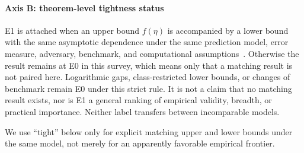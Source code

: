 \documentclass[acmsmall,screen,nonacm]{acmart}
\theoremstyle{acmdefinition}%
\begin{document}
\paragraph{Axis B: theorem-level tightness status} E1 is attached when an upper bound $f(\eta)$ is accompanied by a lower bound with the same asymptotic dependence under the same prediction model, error measure, adversary, benchmark, and computational assumptions~\cite{wei2020optimal,antoniadis2023metric,dinitz2024binarysearch,balkanski2024randomized}. Otherwise the result remains at E0 in this survey, which means only that a matching result is not paired here. Logarithmic gaps, class-restricted lower bounds, or changes of benchmark remain E0 under this strict rule. It is not a claim that no matching result exists, nor is E1 a general ranking of empirical validity, breadth, or practical importance. Neither label transfers between incomparable models.

We use ``tight'' below only for explicit matching upper and lower bounds under the same model, not merely for an apparently favorable empirical frontier.
\end{document}
